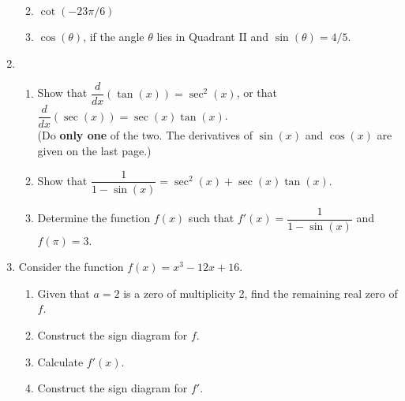 \documentclass[12pt]{article}
\newcommand{\points}[1]{\marginpar{\hspace{24pt}[#1]}}
\begin{document}
\begin{enumerate}
\begin{enumerate}
\vspace{1.5in}

 \item $\cot (-23\pi/6)$ \points{3}

\vspace{2in}

 \item $\cos(\theta)$, if the angle $\theta$ lies in Quadrant II and $\sin(\theta) = 4/5$. \points{3}
\end{enumerate}
\newpage

\item \begin{enumerate}
\item Show that $\dfrac{d}{dx}(\tan (x)) = \sec^2 (x)$, or that $\dfrac{d}{dx}(\sec(x)) = \sec(x)\tan(x)$.\\
\hskip-60pt(Do {\bf only one} of the two. The derivatives of $\sin (x)$ and $\cos (x)$ are given on the last page.)\points{3}

\vspace{2.5in}

\item Show that $\dfrac{1}{1-\sin (x)} = \sec^2(x)+\sec(x)\tan(x)$.\points{4}

\vspace{2.5in}

\item Determine the function $f(x)$ such that $f'(x) = \dfrac{1}{1-\sin(x)}$ and $f(\pi) = 3$. \points{3}
\end{enumerate}
\newpage

\item Consider the function $f(x) = x^3-12x+16$.
\begin{enumerate}
 \item Given that $a=2$ is a zero of multiplicity 2, find the remaining real zero of $f$. \points{3}

\vspace{3in}

 \item Construct the sign diagram for $f$. \points{1}

\vspace{1.25in}

 \item Calculate $f'(x)$. \points{2}
 
\vspace{1.5in}

 \item Construct the sign diagram for $f'$. \points{2} 
\newpage


\end{enumerate}
\end{enumerate}
\end{document}
